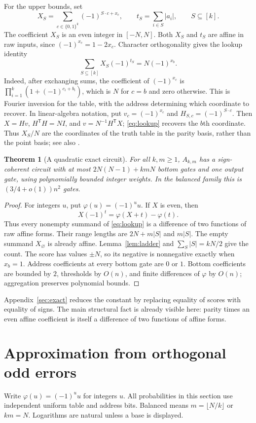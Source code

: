 \documentclass[11pt]{article}
\newtheorem{theorem}{Theorem}[section]
\newcommand{\bits}{\{0,1\}}
\begin{document}
For the upper bounds, set
$$
X_S=\sum_{c\in\bits^k}(-1)^{S\cdot c+x_c},\qquad
t_S=\sum_{i\in S}|a_i|,\qquad S\subseteq[k].
$$
The coefficient $X_S$ is an even integer in $[-N,N]$.
Both $X_S$ and $t_S$ are affine in raw inputs, since
$(-1)^{x_c}=1-2x_c$. Character orthogonality gives the lookup identity
\begin{equation}\label{eq:lookup}
\sum_{S\subseteq[k]}X_S(-1)^{t_S}=N(-1)^{x_b}.
\end{equation}
Indeed, after exchanging sums, the coefficient of $(-1)^{x_c}$ is
$\prod_{i=1}^k(1+(-1)^{c_i+b_i})$, which is $N$ for $c=b$ and zero otherwise.
This is Fourier inversion for the table, with the address determining
which coordinate to recover. In linear-algebra notation, put
$v_c=(-1)^{x_c}$ and $H_{S,c}=(-1)^{S\cdot c}$. Then
$X=Hv$, $H^{\mathsf T}H=NI$, and $v=N^{-1}H^{\mathsf T}X$;
\eqref{eq:lookup} recovers the $b$th coordinate. Thus $X_S/N$ are the
coordinates of the truth table in the parity basis, rather than the point
basis; see also \cite[Chapter~1]{OD}.

\begin{theorem}[A quadratic exact circuit]\label{thm:simple}
For all $k,m\ge1$, $A_{k,m}$ has a sign-coherent circuit with at most
$2N(N-1)+kmN$ bottom gates and one output gate, using polynomially
bounded integer weights. In the balanced family this is
$(3/4+o(1))n^2$ gates.
\end{theorem}
\begin{proof}
For integers $u$, put $\varphi(u)=(-1)^u u$. If $X$ is even, then
$$X(-1)^t=\varphi(X+t)-\varphi(t).$$
Thus every nonempty summand of \eqref{eq:lookup} is a difference of two
functions of raw affine forms. Their range lengths are $2N+m|S|$ and
$m|S|$. The empty summand $X_\varnothing$ is already affine.
Lemma~\ref{lem:ladder} and $\sum_S|S|=kN/2$ give the count.
The score has values $\pm N$, so its negative is nonnegative exactly
when $x_b=1$. Address coefficients at every bottom gate are $0$ or $1$.
Bottom coefficients are bounded by $2$, thresholds by $O(n)$, and finite
differences of $\varphi$ by $O(n)$; aggregation preserves polynomial bounds.
\end{proof}

Appendix~\ref{sec:exact} reduces the constant by replacing equality of
scores with equality of signs. The main structural fact is already
visible here: parity times an even affine coefficient is itself a
difference of two functions of affine forms.

\section{Approximation from orthogonal odd errors}\label{sec:approx}
Write $\varphi(u)=(-1)^u u$ for integers $u$. All probabilities in this
section use independent uniform table and address bits. Balanced means $m=\lfloor N/k\rfloor$ or $km=N$.
Logarithms are natural unless a base is displayed.
\end{document}
